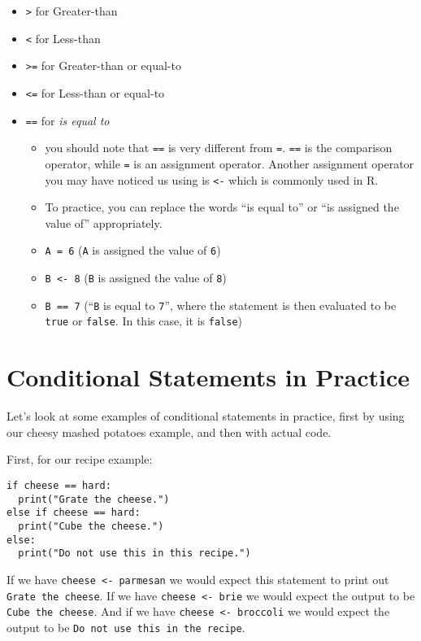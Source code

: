 \documentclass[
]{book}
\providecommand{\tightlist}{%
  \setlength{\itemsep}{0pt}\setlength{\parskip}{0pt}}
\begin{document}
\begin{itemize}
\tightlist
\item
  \texttt{\textgreater{}} for Greater-than
\item
  \texttt{\textless{}} for Less-than
\item
  \texttt{\textgreater{}=} for Greater-than or equal-to
\item
  \texttt{\textless{}=} for Less-than or equal-to
\item
  \texttt{==} for \emph{is equal to}

  \begin{itemize}
  \tightlist
  \item
    you should note that \texttt{==} is very different from \texttt{=}. \texttt{==} is the comparison operator, while \texttt{=} is an assignment operator. Another assignment operator you may have noticed us using is \texttt{\textless{}-} which is commonly used in R.
  \item
    To practice, you can replace the words ``is equal to'' or ``is assigned the value of'' appropriately.
  \item
    \texttt{A\ =\ 6} (\texttt{A} is assigned the value of \texttt{6})
  \item
    \texttt{B\ \textless{}-\ 8} (\texttt{B} is assigned the value of \texttt{8})
  \item
    \texttt{B\ ==\ 7} (``\texttt{B} is equal to \texttt{7}'', where the statement is then evaluated to be \texttt{true} or \texttt{false}. In this case, it is \texttt{false})
  \end{itemize}
\end{itemize}

\section{Conditional Statements in Practice}\label{conditional-statements-in-practice}

Let's look at some examples of conditional statements in practice, first by using our cheesy mashed potatoes example, and then with actual code.

First, for our recipe example:

\begin{verbatim}
if cheese == hard:
  print("Grate the cheese.")
else if cheese == hard:
  print("Cube the cheese.")
else:
  print("Do not use this in this recipe.")
\end{verbatim}

If we have \texttt{cheese\ \textless{}-\ parmesan} we would expect this statement to print out \texttt{Grate\ the\ cheese}. If we have \texttt{cheese\ \textless{}-\ brie} we would expect the output to be \texttt{Cube\ the\ cheese}. And if we have \texttt{cheese\ \textless{}-\ broccoli} we would expect the output to be \texttt{Do\ not\ use\ this\ in\ the\ recipe}.
\end{document}
